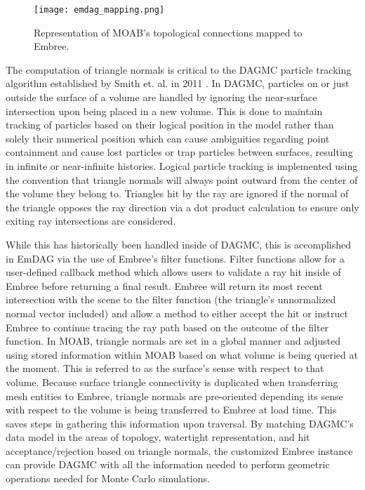 \begin{figure}
  \centering
  \texttt{[image: emdag\_mapping.png]}
  \caption[MOAB to Embree geometric topology mapping.]{Representation of MOAB's
    topological connections mapped to Embree.}
  \label{fig:emdag_mapping}
\end{figure}

The computation of triangle normals is critical to the DAGMC particle
tracking algorithm established by Smith et. al. in 2011 \cite{Smith_2011}. In
DAGMC, particles on or just outside the surface of a volume are handled by
ignoring the near-surface intersection upon being placed in a new volume. This
is done to maintain tracking of particles based on their logical position in the
model rather than solely their numerical position which can cause ambiguities
regarding point containment and cause lost particles or trap particles between
surfaces, resulting in infinite or near-infinite histories. Logical particle
tracking is implemented using the convention that triangle normals will always
point outward from the center of the volume they belong to. Triangles hit by the
ray are ignored if the normal of the triangle opposes the ray direction via a
dot product calculation to ensure only exiting ray intersections are
considered.

While this has historically been handled inside of DAGMC, this is accomplished
in EmDAG via the use of Embree's filter functions. Filter functions allow for a
user-defined callback method which allows users to validate a ray hit inside of
Embree before returning a final result. Embree will return its most recent
intersection with the scene to the filter function (the triangle's unnormalized
normal vector included) and allow a method to either accept the hit or instruct
Embree to continue tracing the ray path based on the outcome of the filter
function. In MOAB, triangle normals are set in a global manner and adjusted
using stored information within MOAB based on what volume is being queried at
the moment. This is referred to as the surface's sense with respect to that
volume. Because surface triangle connectivity is duplicated when transferring
mesh entities to Embree, triangle normals are pre-oriented depending its sense
with respect to the volume is being transferred to Embree at load time. This
saves steps in gathering this information upon traversal. By matching DAGMC's
data model in the areas of topology, watertight representation, and hit
acceptance/rejection based on triangle normals, the customized Embree instance
can provide DAGMC with all the information needed to perform geometric
operations needed for Monte Carlo simulations.

